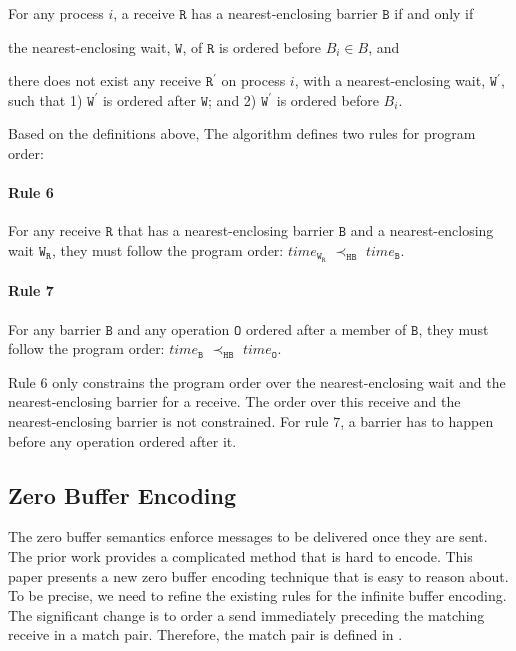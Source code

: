 \begin{definition}\label{def:nb}
For any process $i$, a receive $\mathtt{R}$ has a nearest-enclosing barrier $\mathtt{B}$ if and only if
\begin{compactenum}
\item the nearest-enclosing wait, $\mathtt{W}$, of $\mathtt{R}$ is ordered before $B_i\in B$, and
\item there does not exist any receive $\mathtt{R^\prime}$ on process $i$, with a nearest-enclosing wait, $\mathtt{W^\prime}$, such that 1) $\mathtt{W^\prime}$ is ordered after $\mathtt{W}$; and 2) $\mathtt{W^\prime}$ is ordered before $B_i$.
\end{compactenum}
\end{definition}

Based on the definitions above, The algorithm defines two rules for program order:

\paragraph*{Rule 6} For any receive $\mathtt{R}$ that has a nearest-enclosing barrier $\mathtt{B}$ and a nearest-enclosing wait $\mathtt{W}_\mathtt{R}$, they must follow the program order:
$\mathit{time}_{\mathtt{W}_\mathtt{R}}$ $\prec_\mathtt{HB}$ $\mathit{time}_\mathtt{B}$.

\paragraph*{Rule 7} For any barrier $\mathtt{B}$ and any operation $\mathtt{O}$ ordered after a member of $\mathtt{B}$, they must follow the program order: $\mathit{time}_\mathtt{B}$
$\prec_\mathtt{HB}$ $\mathit{time}_\mathtt{O}$.

Rule $6$ only constrains the program order over the nearest-enclosing wait and the nearest-enclosing barrier for a receive. The order over this receive and the nearest-enclosing barrier is not constrained. For rule $7$, a barrier has to happen before any operation ordered after it. 

\subsection{Zero Buffer Encoding}
The zero buffer semantics enforce messages to be delivered once they are sent. The prior work \cite{DBLP:conf/kbse/HuangMM13} provides a complicated method that is hard to encode. This paper presents a new zero buffer encoding technique that is easy to reason about. To be precise, we need to refine the existing rules for the infinite buffer encoding. The significant change is to order a send immediately preceding the matching receive in a match pair. Therefore, the match pair is defined in . 

